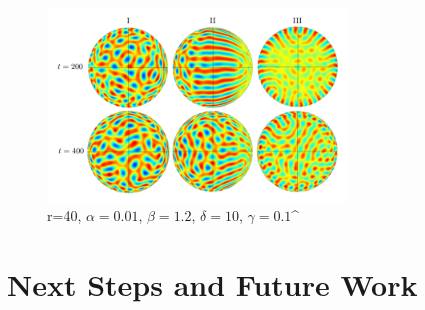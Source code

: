\documentclass{beamer}
\begin{document}
            \begin{frame}{\insertsubsectionhead}
            
                \begin{figure}
                    \centering
                    \includegraphics[width=8cm, frame]{Images/sol03.png}
                    \caption{r=40, $\alpha=0.01$, $\beta=1.2$, $\delta=10$, $\gamma=0.1$^\cite{Krause2018}}
                \end{figure}
                
            \end{frame}
        
    \section[Future Work]{Next Steps and Future Work}
        
\end{document}
